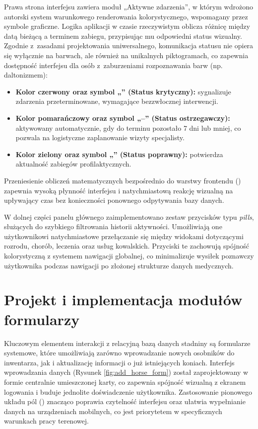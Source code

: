 Prawa strona interfejsu zawiera moduł „Aktywne zdarzenia”, w którym wdrożono autorski system warunkowego renderowania kolorystycznego, wspomagany przez symbole graficzne. Logika aplikacji w czasie rzeczywistym oblicza różnicę między datą bieżącą a terminem zabiegu, przypisując mu odpowiedni status wizualny. Zgodnie z~zasadami projektowania uniwersalnego, komunikacja statusu nie opiera się wyłącznie na barwach, ale również na unikalnych piktogramach, co zapewnia dostępność interfejsu dla osób z~zaburzeniami rozpoznawania barw (np. daltonizmem):
\begin{itemize}
    \item \textbf{Kolor czerwony oraz symbol „\texttimes” (Status krytyczny):} sygnalizuje zdarzenia przeterminowane, wymagające bezzwłocznej interwencji.
    \item \textbf{Kolor pomarańczowy oraz symbol „--” (Status ostrzegawczy):} aktywowany automatycznie, gdy do terminu pozostało 7 dni lub mniej, co pozwala na logistyczne zaplanowanie wizyty specjalisty.
    \item \textbf{Kolor zielony oraz symbol „\checkmark” (Status poprawny):} potwierdza aktualność zabiegów profilaktycznych.
\end{itemize}

Przeniesienie obliczeń matematycznych bezpośrednio do warstwy frontendu () zapewnia wysoką płynność interfejsu i natychmiastową reakcję wizualną na upływający czas bez konieczności ponownego odpytywania bazy danych.

W dolnej części panelu głównego zaimplementowano zestaw przycisków typu \textit{pills}, służących do szybkiego filtrowania historii aktywności. Umożliwiają one użytkownikowi natychmiastowe przełączanie się między widokami dotyczącymi rozrodu, chorób, leczenia oraz usług kowalskich. Przyciski te zachowują spójność kolorystyczną z systemem nawigacji globalnej, co minimalizuje wysiłek poznawczy użytkownika podczas nawigacji po złożonej strukturze danych medycznych.

\section{Projekt i implementacja modułów formularzy}

Kluczowym elementem interakcji z relacyjną bazą danych stadniny są formularze systemowe, które umożliwiają zarówno wprowadzanie nowych osobników do inwentarza, jak i aktualizację informacji o już istniejących koniach. Interfejs wprowadzania danych (Rysunek \ref{fig:add_horse_form}) został zaprojektowany w formie centralnie umieszczonej karty, co zapewnia spójność wizualną z ekranem logowania i buduje jednolite doświadczenie użytkownika. Zastosowanie pionowego układu pól () znacząco poprawia czytelność interfejsu oraz ułatwia wypełnianie danych na urządzeniach mobilnych, co jest priorytetem w specyficznych warunkach pracy terenowej.

